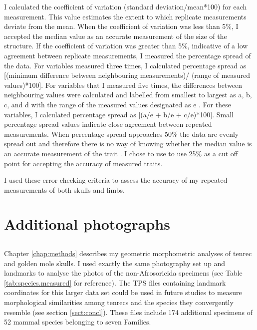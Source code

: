 	I calculated the coefficient of variation (standard deviation/mean*100) for each measurement. This value estimates the extent to which replicate measurements deviate from the mean. When the coefficient of variation was less than 5\%, I accepted the median value as an accurate measurement of the size of the structure. 
	If the coefficient of variation was greater than 5\%, indicative of a low agreement between replicate measurements, I measured the percentage spread of the data. For variables measured three times, I calculated percentage spread as [(minimum difference between neighbouring measurements)/ (range of measured values)*100].
	For variables that I measured five times, the differences between neighbouring values were calculated and labelled from smallest to largest as a, b, c, and d with the range of the measured values designated as e \citep[see][for a full explanation]{Cooper2009}. For these variables, I calculated percentage spread as [(a/e + b/e + c/e)*100]. 
	Small percentage spread values indicate close agreement between repeated measurements. When percentage spread approaches 50\% the data are evenly spread out and therefore there is no way of knowing whether the median value is an accurate measurement of the trait \citep{Cooper2009}. I chose to use to use 25\% as a cut off point for accepting the accuracy of measured traits.

	I used these error checking criteria to assess the accuracy of my repeated measurements of both skulls and limbs. 

\section{Additional photographs}
	\subsection{}
	Chapter \ref{chap:methods} describes my geometric morphometric analyses of tenrec and golden mole skulls. I used exactly the same photography set up and landmarks to analyse the photos of the non-Afrosoricida specimens (see Table \ref{tab:species.measured} for reference). The TPS files containing landmark coordinates for this larger data set could be used in future studies to measure morphological similarities among tenrecs and the species they convergently resemble (see section \ref{sect:concl}). These files include 174 additional specimens of 52 mammal species belonging to seven Families.
		
